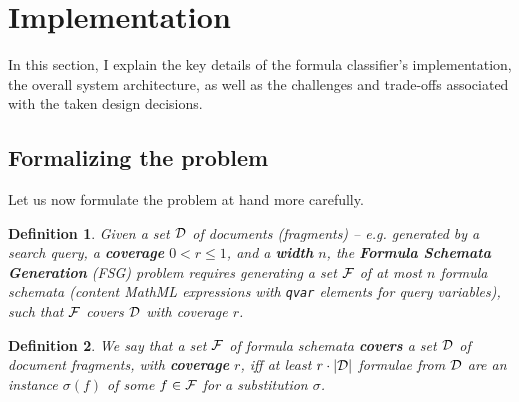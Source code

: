 \documentclass[a4paper,oneside]{article}
\newtheorem{definition}{Definition}
\begin{document}
\section{Implementation}\label{sec:implementation}

In this section, I explain the key details of the formula classifier's
implementation, the overall system architecture, as well as the challenges and
trade-offs associated with the taken design decisions.

\subsection{Formalizing the problem}\label{subsec:formal_problem}
Let us now formulate the problem at hand more carefully.

\begin{definition}
  Given a set $\mathcal{D}$ of documents (fragments) -- e.g. generated by a search
  query, a \textbf{coverage} $0<r\leq1$, and a \textbf{width} $n$, the
  \textbf{Formula Schemata Generation} (FSG) problem requires generating
  a set $\mathcal{F}$ of at most $n$ formula schemata (content MathML expressions with
  \lstinline|qvar| elements for query variables), such that $\mathcal{F}$ covers $\mathcal{D}$
  with coverage $r$.
\end{definition}

\begin{definition}
  We say that a set $\mathcal{F}$ of formula schemata \textbf{covers} a set $\mathcal{D}$ of
  document fragments, with \textbf{coverage} $r$, iff at least $r \cdot |\mathcal{D}|$
  formulae from $\mathcal{D}$ are an instance $\sigma(f)$ of some $f\in\mathcal{F}$ for a
  substitution $\sigma$.
\end{definition}
\end{document}
